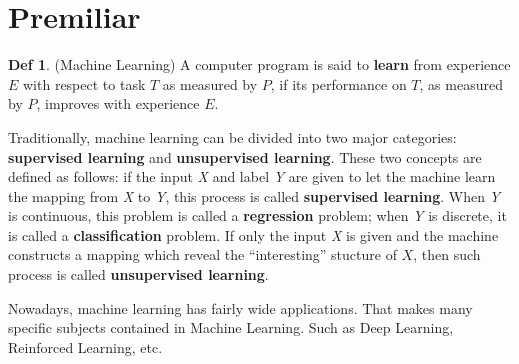 \documentclass{book}
\begin{document}
\theoremstyle{definition} 
\newtheorem{define}{Def}[section]

\theoremstyle{plain} 
\newtheorem{thm}{Theorem}[section] \newtheorem{lema}{Lemma}[chapter] \newtheorem{cor}{Corollary}[chapter]
\newtheorem{prop}{Property}[chapter] \newtheorem{fact}{Fact}[chapter] 


\mainmatter

\chapter*{Premiliar}

\begin{define}(Machine Learning)
    A computer program is said to \textbf{learn} from experience $E$ with respect to task $T$ as measured by $P$, if its performance on $T$,
    as measured by $P$, improves with experience $E$.
\end{define}

\par
Traditionally, machine learning can be divided into two major categories: \textbf{supervised learning} and \textbf{unsupervised learning}. These two concepts are defined as follows:
if the input \textit{X} and label \textit{Y} are given to let the machine learn the mapping from \textit{X} to \textit{Y}, this process is called \textbf{supervised learning}. When
\textit{Y} is continuous, this problem is called a \textbf{regression} problem; when \textit{Y} is discrete, it is called a \textbf{classification} problem. If only the input \textit{X}
is given and the machine constructs a mapping which reveal the ``interesting'' stucture of $X$, then such process is called \textbf{unsupervised learning}.

Nowadays, machine learning has fairly wide applications. That makes many specific subjects contained in Machine Learning. Such as Deep Learning, Reinforced Learning, etc.



\end{document}
